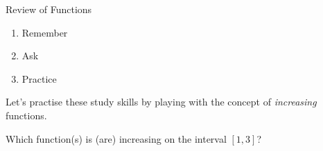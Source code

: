 \documentclass[../main.tex]{subfiles}
\begin{document}
\begin{lesson}{Review of Functions}
  \begin{mdframed}[style=simple]
    \begin{enumerate}
      \item Remember \underline{\hspace{4in}}
      \item Ask \underline{\hspace{4.5in}}
      \item Practice \underline{\hspace{4.2in}} 
    \end{enumerate}
  \end{mdframed}


  \begin{example}
    Let's practise these study skills by playing with the concept of \emph{increasing} functions.

    \faComments{} Which function(s) is (are) increasing on the interval \([1,3]\)?


\end{example}
\end{lesson}
\end{document}
